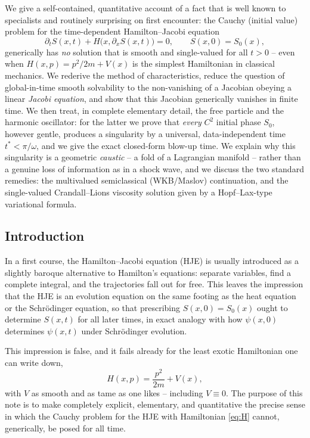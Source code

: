 We give a self-contained, quantitative account of a fact that is well known to
specialists and routinely surprising on first encounter: the Cauchy
(initial value) problem for the time-dependent Hamilton--Jacobi equation
\[
\partial_t S(x,t) + H\big(x,\partial_x S(x,t)\big) = 0, \qquad S(x,0) = S_0(x),
\]
generically has \emph{no} solution that is smooth and single-valued for all
$t>0$ -- even when $H(x,p) = p^2/2m + V(x)$ is the simplest Hamiltonian in
classical mechanics. We rederive the method of characteristics, reduce the
question of global-in-time smooth solvability to the non-vanishing of a
Jacobian obeying a linear \emph{Jacobi equation}, and show that this
Jacobian generically vanishes in finite time. We then treat, in complete
elementary detail, the free particle and the harmonic oscillator: for the
latter we prove that \emph{every} $C^2$ initial phase $S_0$, however
gentle, produces a singularity by a universal, data-independent time
$t^\ast < \pi/\omega$, and we give the exact closed-form blow-up time. We
explain why this singularity is a geometric \emph{caustic} -- a fold of a
Lagrangian manifold -- rather than a genuine loss of information as in a
shock wave, and we discuss the two standard remedies: the multivalued
semiclassical (WKB/Maslov) continuation, and the single-valued
Crandall--Lions viscosity solution given by a Hopf--Lax-type variational
formula.

\subsection{Introduction}

In a first course, the Hamilton--Jacobi equation (HJE) is usually introduced as
a slightly baroque alternative to Hamilton's equations: separate variables,
find a complete integral, and the trajectories fall out for free. This leaves
the impression that the HJE is an evolution equation on the same footing as the
heat equation or the Schr\"odinger equation, so that prescribing
$S(x,0)=S_0(x)$ ought to determine $S(x,t)$ for all later times, in exact
analogy with how $\psi(x,0)$ determines $\psi(x,t)$ under Schr\"odinger
evolution.

This impression is false, and it fails already for the least exotic Hamiltonian
one can write down,
\begin{equation}
H(x,p) = \frac{p^2}{2m} + V(x),
\label{eq:H}
\end{equation}
with $V$ as smooth and as tame as one likes -- including $V\equiv 0$. The
purpose of this note is to make completely explicit, elementary, and
quantitative the precise sense in which the Cauchy problem for the HJE with
Hamiltonian \eqref{eq:H} cannot, generically, be posed for all time.

